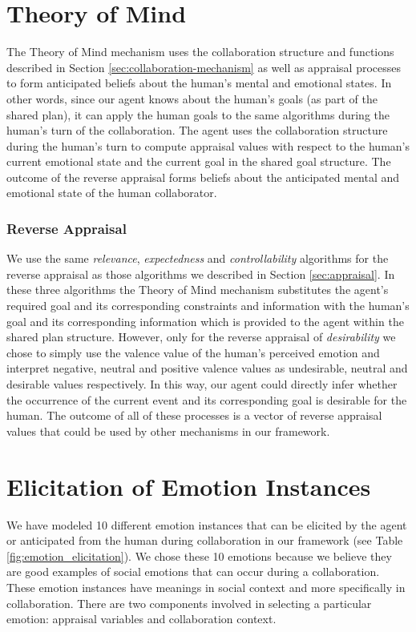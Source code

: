 \documentclass[12pt]{report}
\begin{document}
\section{Theory of Mind}
\label{sec:theory-of-mind-implementation}
{\color{red}The Theory of Mind mechanism uses the collaboration structure and
functions described in Section \ref{sec:collaboration-mechanism} as well as appraisal
processes to form anticipated beliefs about the human's mental and emotional
states. In other words, since our agent knows about the human's goals (as part
of the shared plan), it can apply the human goals to the same algorithms during
the human's turn of the collaboration. The agent uses the collaboration
structure during the human's turn to compute appraisal values with respect to
the human's current emotional state and the current goal in the shared goal
structure. The outcome of the reverse appraisal forms beliefs about the
anticipated mental and emotional state of the human collaborator.

\subsubsection{Reverse Appraisal}
We use the same \textit{relevance}, \textit{expectedness} and
\textit{controllability} algorithms for the reverse appraisal as those
algorithms we described in Section \ref{sec:appraisal}. In these three
algorithms the Theory of Mind mechanism substitutes the agent's required goal
and its corresponding constraints and information with the human's goal and its
corresponding information which is provided to the agent within the shared plan
structure.  However, only for the reverse appraisal of \textit{desirability} we
chose to simply use the valence value of the human's perceived emotion and
interpret negative, neutral and positive valence values as undesirable, neutral
and desirable values respectively. In this way, our agent could directly infer
whether the occurrence of the current event and its corresponding goal is
desirable for the human. The outcome of all of these processes is a vector of
reverse appraisal values that could be used by other mechanisms in our
framework.}

\section{Elicitation of Emotion Instances}
We have modeled 10 different emotion instances that can be elicited by the agent
or anticipated from the human during collaboration in our framework (see Table
\ref{fig:emotion_elicitation}). {\color{red}We chose these 10 emotions because
we believe they are good examples of social emotions that can occur during a
collaboration.} These emotion instances have meanings in social context and more
specifically in collaboration. There are two components involved in selecting a
particular emotion: appraisal variables and collaboration context.
\end{document}
